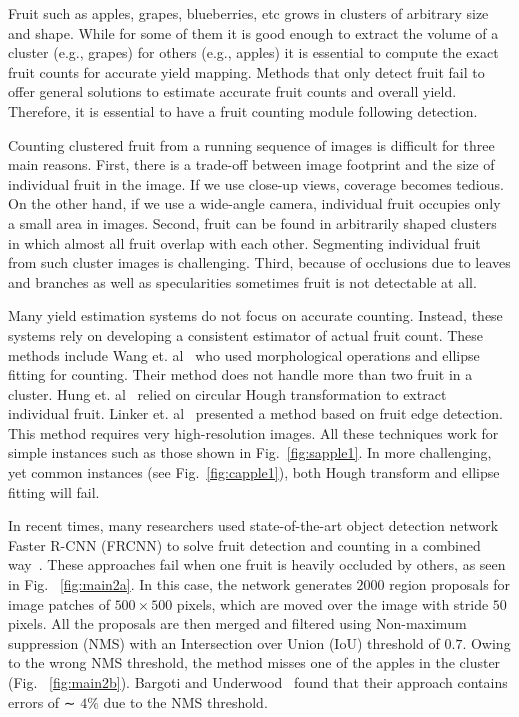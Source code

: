  Fruit such as apples, grapes, blueberries, etc grows in clusters of arbitrary size and shape. While for some of them it is good enough to extract the volume of a cluster (e.g., grapes) for others (e.g., apples) it is essential to compute the exact fruit counts for accurate yield mapping. Methods that only detect fruit fail to offer general solutions to estimate accurate fruit counts and overall yield. Therefore, it is essential to have a fruit counting module following detection.
 
 Counting clustered fruit from a running sequence of images is difficult for three main reasons. First, there is a trade-off between image footprint and the size of individual fruit in the image. If we use close-up views, coverage becomes tedious. On the other hand, if we use a wide-angle camera,  individual fruit occupies only a small area in images. Second, fruit can be found in arbitrarily shaped clusters in which almost all fruit overlap with each other. Segmenting individual fruit from such cluster images is challenging. Third, because of occlusions due to leaves and branches as well as specularities sometimes fruit is not detectable at all. 

Many yield estimation systems do not focus on accurate counting. Instead, these systems rely on developing a consistent estimator of actual fruit count. These methods include Wang et. al~\cite{wang} who used morphological operations and ellipse fitting for counting. Their method does not handle more than two fruit in a cluster. Hung et. al~\cite{hung2015feature} relied on circular Hough transformation to extract individual fruit. Linker et. al~\cite{Linker}  presented a method based on fruit edge detection. This method requires very high-resolution images. All these techniques work for simple instances such as those shown in  Fig.~\ref{fig:sapple1}. In more challenging, yet common instances (see Fig.~\ref{fig:capple1}), both Hough transform and ellipse fitting will fail. 

In recent times, many researchers used state-of-the-art object detection network Faster R-CNN (FRCNN) to solve fruit detection and counting in a combined way~\cite{bargoti_deep_2017,sa_deepfruits:_2016}. These approaches fail when one fruit is heavily occluded by others, as seen in Fig. ~\ref{fig:main2a}. In this case, the network generates $2000$ region proposals for image patches of $500 \times 500$ pixels, which are moved over the image with stride $50$ pixels. All the proposals are then merged and filtered using Non-maximum suppression (NMS) with an Intersection over Union (IoU) threshold of $0.7$. Owing to the wrong NMS threshold, the method misses one of the apples in the cluster (Fig. ~\ref{fig:main2b}). Bargoti and Underwood~\cite{bargoti_deep_2017} found that their approach contains errors of ∼ $4\%$ due to the NMS threshold.


